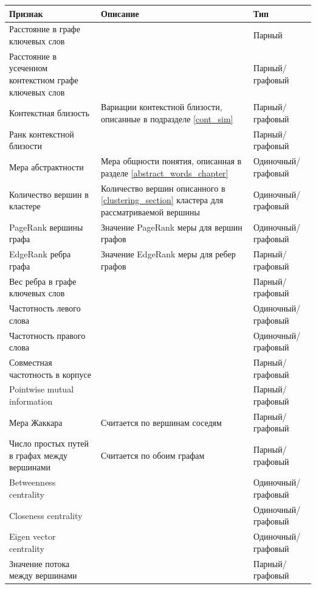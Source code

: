\begin{tabularx}{16cm}{|X|X|X|}
        \hline
        Признак & Описание & Тип \\ \hline
        Расстояние в графе ключевых слов & & Парный \\ \hline
        Расстояние в усеченном контекстном графе ключевых слов & & Парный/графовый \\ \hline
        Контекстная близость & Вариации контекстной близости, описанные в подразделе \ref{cont_sim} & Парный/графовый \\ \hline
        Ранк контекстной близости & & Парный/графовый \\ \hline
        Мера абстрактности & Мера общности понятия, описанная в разделе \ref{abstract_words_chapter} & Одиночный/графовый \\ \hline
        Количество вершин в кластере & Количество вершин описанного в \ref{clustering_section} кластера для рассматриваемой вершины & Одиночный/графовый \\ \hline
        PageRank вершины графа & Значение PageRank меры для вершин графов & Одиночный/графовый \\ \hline
        EdgeRank ребра графа & Значение EdgeRank меры для ребер графов & Парный/графовый \\ \hline
        Вес ребра в графе ключевых слов & & Парный/графовый \\ \hline
        Частотность левого слова & & Одиночный/графовый \\ \hline
        Частотность правого слова & & Одиночный/графовый \\ \hline
        Совместная частотность в корпусе & & Парный/графовый \\ \hline
        Pointwise mutual information & & Парный/графовый \\ \hline
        Мера Жаккара & Считается по вершинам соседям & Парный/графовый \\ \hline
        Число простых путей в графах между вершинами & Считается по обоим графам & Парный/графовый \\ \hline
        Betweenness centrality  & & Одиночный/графовый \\ \hline
        Closeness centrality & & Одиночный/графовый \\ \hline
        Eigen vector centrality & & Одиночный/графовый \\ \hline
        Значение потока между вершинами & & Парный/графовый \\ \hline

\end{tabularx}
